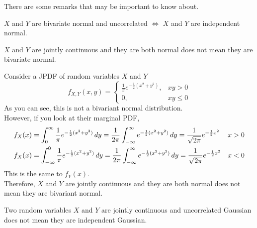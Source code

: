 \documentclass{huhtakm-template-book}
\begin{document}
    There are some remarks that may be important to know about.
    \begin{rem}
        $X$ and $Y$ are bivariate normal and uncorrelated $\iff$ $X$ and $Y$ are independent normal.
    \end{rem}
    \begin{rem}
        $X$ and $Y$ are jointly continuous and they are both normal does not mean they are bivariate normal.
    \end{rem}
    \begin{eg}
        Consider a JPDF of random variables $X$ and $Y$
        \begin{equation*}
            f_{X,Y}(x,y)=\begin{cases}
                \frac{1}{\pi}e^{-\frac{1}{2}(x^{2}+y^{2})}, &xy>0\\
                0, &xy\leq 0
            \end{cases}
        \end{equation*}
        As you can see, this is not a bivariant normal distribution.\\
        However, if you look at their marginal PDF,
        \begin{align*}
            f_{X}(x)&=\int_{0}^{\infty}\frac{1}{\pi}e^{-\frac{1}{2}(x^{2}+y^{2})}\,dy=\frac{1}{2\pi}\int_{-\infty}^{\infty} e^{-\frac{1}{2}(x^{2}+y^{2})}\,dy=\frac{1}{\sqrt{2\pi}}e^{-\frac{1}{2}x^{2}} & x&>0\\
            f_{X}(x)&=\int_{-\infty}^{0}\frac{1}{\pi}e^{-\frac{1}{2}(x^{2}+y^{2})}\,dy=\frac{1}{2\pi}\int_{-\infty}^{\infty} e^{-\frac{1}{2}(x^{2}+y^{2})}\,dy=\frac{1}{\sqrt{2\pi}}e^{-\frac{1}{2}x^{2}} & x&<0
        \end{align*}
        This is the same to $f_{Y}(x)$.\\
        Therefore, $X$ and $Y$ are jointly continuous and they are both normal does not mean they are bivariant normal.
    \end{eg}
    \begin{rem}
        Two random variables $X$ and $Y$ are jointly continuous and uncorrelated Gaussian does not mean they are independent Gaussian.
    \end{rem}
    
\end{document}
